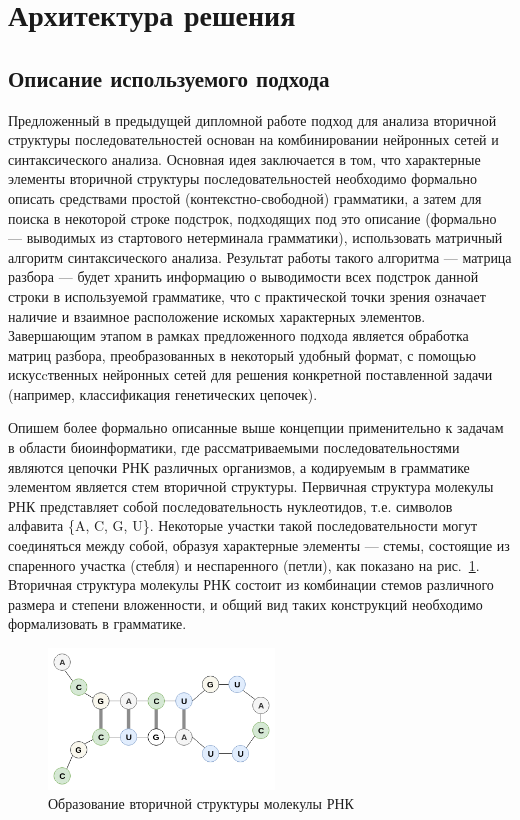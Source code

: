 \documentclass[14pt]{matmex-diploma-custom}
\begin{document}
\section{Архитектура решения}
\subsection{Описание используемого подхода}
Предложенный в предыдущей дипломной работе подход для анализа вторичной структуры последовательностей основан на комбинировании нейронных сетей и синтаксического анализа. Основная идея заключается в том, что характерные элементы вторичной структуры последовательностей необходимо формально описать средствами простой (контекстно-свободной) грамматики, а затем для поиска в некоторой строке подстрок, подходящих под это описание (формально --- выводимых из стартового нетерминала грамматики), использовать матричный алгоритм синтаксического анализа. Результат работы такого алгоритма --- матрица разбора --- будет хранить информацию о выводимости всех подстрок данной строки в используемой грамматике, что с практической точки зрения означает наличие и взаимное расположение искомых характерных элементов. Завершающим этапом в рамках предложенного подхода является обработка матриц разбора, преобразованных в некоторый удобный формат, с помощью искусcтвенных нейронных сетей для решения конкретной поставленной задачи (например, классификация генетических цепочек). 

Опишем более формально описанные выше концепции применительно к задачам в области биоинформатики, где рассматриваемыми последовательностями являются цепочки РНК различных организмов, а кодируемым в грамматике элементом является стем вторичной структуры. Первичная структура молекулы РНК представляет собой последовательность нуклеотидов, т.е. символов алфавита \{A, C, G, U\}. Некоторые участки такой последовательности могут соединяться между собой, образуя характерные элементы --- стемы, состоящие из спаренного участка (стебля) и неспаренного (петли), как показано на рис.~\ref{molekula}. Вторичная структура молекулы РНК состоит из комбинации стемов различного размера и степени вложенности, и общий вид таких конструкций необходимо формализовать в грамматике.

\begin{figure}[h]
\begin{center}
\centering
\includegraphics[width=6cm]{pics/molekula.png}
\caption{Образование вторичной структуры молекулы РНК}
\label{molekula}
\end{center}
\end{figure} 
\end{document}
